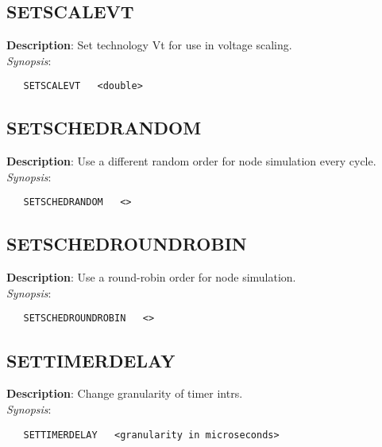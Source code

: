 \subsection{\bf SETSCALEVT}
\label{manpages:SETSCALEVT}
\label{manpages:setscalevt}
\vspace{-0.2in}
{\bf Description}: 	Set technology Vt for use in voltage scaling.\\[1.5ex]
{\em Synopsis}:
\vspace{-0.2in}
\scriptsize
\begin{verbatim}
   SETSCALEVT   <double>		
\end{verbatim}
\normalsize
\vspace{-0.2in}


\subsection{\bf SETSCHEDRANDOM}
\label{manpages:SETSCHEDRANDOM}
\label{manpages:setschedrandom}
\vspace{-0.2in}
{\bf Description}: 	Use a different random order for node simulation every cycle.\\[1.5ex]
{\em Synopsis}:
\vspace{-0.2in}
\scriptsize
\begin{verbatim}
   SETSCHEDRANDOM   <>	
\end{verbatim}
\normalsize
\vspace{-0.2in}


\subsection{\bf SETSCHEDROUNDROBIN}
\label{manpages:SETSCHEDROUNDROBIN}
\label{manpages:setschedroundrobin}
\vspace{-0.2in}
{\bf Description}: 	Use a round-robin order for node simulation.\\[1.5ex]
{\em Synopsis}:
\vspace{-0.2in}
\scriptsize
\begin{verbatim}
   SETSCHEDROUNDROBIN   <>			
\end{verbatim}
\normalsize
\vspace{-0.2in}


\subsection{\bf SETTIMERDELAY}
\label{manpages:SETTIMERDELAY}
\label{manpages:settimerdelay}
\vspace{-0.2in}
{\bf Description}: 	Change granularity of timer intrs.\\[1.5ex]
{\em Synopsis}:
\vspace{-0.2in}
\scriptsize
\begin{verbatim}
   SETTIMERDELAY   <granularity in microseconds>	
\end{verbatim}
\normalsize
\vspace{-0.2in}



